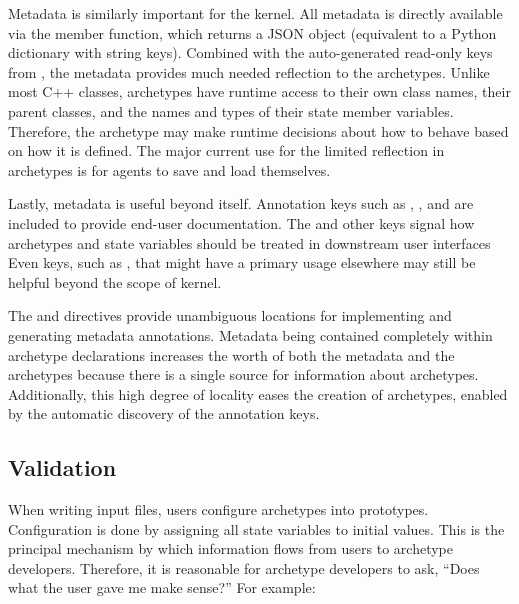Metadata is similarly important for the \cyclus kernel. All metadata is 
directly available via the  member function, which returns 
a \gls{JSON} 
object (equivalent to a Python dictionary with string keys). Combined with the 
auto-generated read-only keys from \cycpp, the metadata provides much needed 
reflection to the archetypes.  Unlike most C++ classes, archetypes have 
runtime access to their own class names, their parent classes, and the names and 
types of their state member variables. Therefore, the archetype may 
make runtime decisions about how to behave based on how it is defined.
The major current use for the limited reflection in archetypes is for agents to 
save and load themselves. 

Lastly, metadata is useful beyond \cyclus itself. Annotation keys such as ,
, and  are included to provide end-user documentation. 
The 
and other keys signal how archetypes and state variables should be treated in 
downstream user interfaces 
Even keys, such as , 
that might have a primary usage elsewhere
may still be helpful beyond the scope of \cyclus kernel.  

The  and  directives provide 
unambiguous locations for implementing and 
generating metadata annotations. Metadata being contained completely within archetype 
declarations increases the worth of both the metadata and the archetypes
because there is a single source for information about archetypes.
Additionally, this high degree of locality eases the creation of
archetypes, enabled by the automatic discovery of the annotation keys.

\subsection{Validation}

When writing \cyclus input files, users configure archetypes into prototypes.
Configuration is done by assigning all state variables to 
initial values. This is the principal mechanism by which information flows 
from users to archetype developers. Therefore, it is reasonable for archetype 
developers to ask, ``Does what the user gave me make sense?'' For example: 


